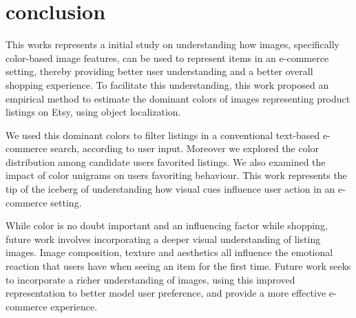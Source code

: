 \documentclass[conference,a4paper]{IEEEtran}
\begin{document}
\section{conclusion}
\label{sec:conclusion}
This works represents a initial study on understanding how images,
specifically color-based image features, can be used to represent
items in an e-commerce setting, thereby providing better user
understanding and a better overall shopping experience. To facilitate
this understanding, this work proposed an  empirical method to
estimate the dominant colors of images representing product listings
on Etsy, using object localization. 

We used this dominant colors to filter listings in a conventional text-based e-commerce search, according to user input. Moreover we explored the color distribution among candidate users favorited listings. We also examined the impact of color unigrams on users favoriting behaviour. This work represents the tip of the iceberg of understanding how visual cues influence user action in an e-commerce setting. 

 While color is no doubt important and an influencing factor while shopping, future work involves incorporating a deeper visual understanding of listing images. Image composition, texture and aesthetics all influence the emotional reaction that users have when seeing an item for the first time. Future work seeks to incorporate a richer understanding of images, using this improved representation to better model user preference, and provide a more effective e-commerce experience.





%

\end{document}
